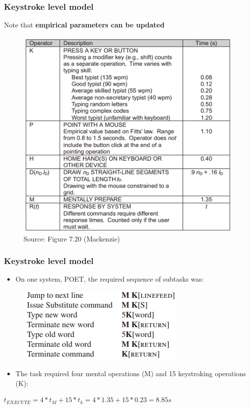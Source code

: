 \documentclass{beamer}
\begin{document}
\begin{frame}
	\frametitle{Keystroke level model}
	\centering
	Note that \textbf{empirical parameters can be updated}
	\begin{figure}
		\centering
		\includegraphics[width=.5\linewidth]{image/7-20}
		\caption{Source: Figure 7.20 (Mackenzie)}
	\end{figure}
\end{frame}

\begin{frame}
	\frametitle{Keystroke level model}
	\begin{itemize}
		\item On one system, POET, the required sequence of subtasks was:
	\end{itemize}
	\begin{figure}
		\centering
		\includegraphics[width=.5\linewidth]{image/klm}
	\end{figure}
	\begin{itemize}
		\item The task required four mental operations (M) and 15 keystroking operations (K):
	\end{itemize}
	\centering
	$t_{EXECUTE} = 4 * t_{M} + 15 * t_{k} = 4 * 1.35 + 15 * 0.23 = 8.85s$
\end{frame}
\end{document}
